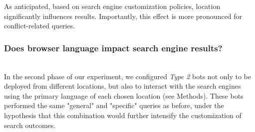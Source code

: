 

\begin{takeaway}
\takeawaytitle{} As anticipated, based on search engine customization policies, location significantly influences results. Importantly, this effect is more pronounced for conflict-related queries.
\end{takeaway}



\subsubsection{Does browser language impact search engine results?}
\hfill\\
In the second phase of our experiment, we configured \textit{Type 2} bots not only to be deployed from different locations, but also to interact with the search engines using the primary language of each chosen location (see Methods). These bots performed the same "general" and "specific" queries as before, under the hypothesis that this combination would further intensify the customization of search outcomes.

